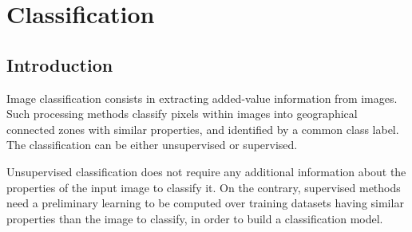 \chapter{Classification}

\section{Introduction}

Image classification consists in extracting added-value information from images. 
Such processing methods classify pixels within images into geographical connected 
zones with similar properties, and identified by a common class label. The 
classification can be either unsupervised or supervised.

Unsupervised classification does not require any additional information about the
properties of the input image to classify it. On the contrary, supervised methods 
need a preliminary learning to be computed over training datasets having similar 
properties than the image to classify, in order to build a classification model.





